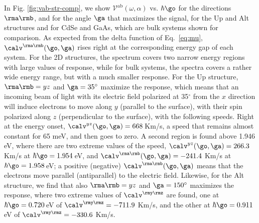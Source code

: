 \documentclass[floatfix,prb,aps,superscriptaddress,showpacs,11pt,preprint,letterpaper]{revtex4}
\begin{document}
In Fig. \ref{fig:vab-str-comp}, we show $\mathcal{V}^{\mathrm{ab}}
(\omega,\alpha)$ vs. $\hbar\go$ for the directions $\rma\rmb$, and for the
angle $\ga$
that maximizes the signal, for the Up  and Alt structures and for CdSe and
GaAs, which are bulk systems shown for comparison.
% 
As expected from the delta function of Eq.~\eqref{eq:mu},
$\calv^{\rma\rmb}(\go,\ga)$ rises right at the corresponding energy gap of each
system. For the 2D structures, the spectrum covers two narrow energy regions
with large values of response, while for bulk systems, the spectra covers a
rather wide energy range, but with a much smaller response.
% 
For the Up structure, $\rma\rmb=yz$ and $\ga=35^\circ$ maximize the response,
which means that an incoming beam of light with its electric field polarized at
35$^\circ$ from the $x$ direction will induce electrons to move along $y$
(parallel to the surface), with their spin polarized along $z$ (perpendicular to
the surface), with the following speeds.
% 
Right at the energy onset, $\calv^{yz}(\go,\ga)=668$\,Km/s, a speed that remains
almost constant for 65 meV, and then goes to zero. A second region is found
above 1.946 eV, where there are two extreme values of the speed,
$\calv^{yz}(\go,\ga)=266.3$ Km/s at $\hbar\go=1.954$\,eV, and
$\calv^{\rma\rmb}(\go,\ga)=-241.4$ Km/s at $\hbar\go=1.958$\,eV; a positive
(negative) $\calv^{\rma\rmb}(\go,\ga)$ means that the electrons move parallel
(antiparallel) to the electric field.
Likewise, for the Alt structure, we find that also $\rma\rmb=yz$ and
$\ga=150^\circ$ maximizes the response, where two extreme values of
$\calv^{\rmy\rmz}$ are found, one at  $\hbar\go=0.720$\,eV of
$\calv^{\rmy\rmz}=-711.9$ Km/s, and the other at $\hbar\go=0.911$\,eV of
$\calv^{\rmy\rmz}=-330.6$ Km/s.
 
\end{document}
